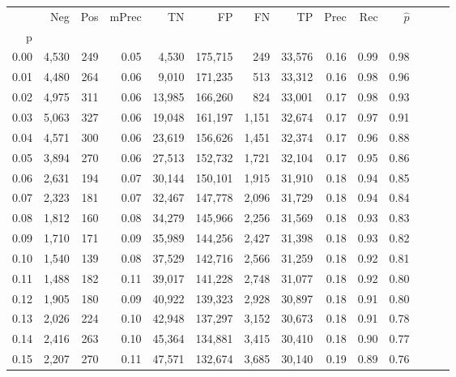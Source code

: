 \begin{tabular}{rrrrrrrrrrrrrr}
\toprule
{} &    Neg &  Pos & mPrec &       TN &       FP &      FN &      TP &  Prec &   Rec & $\hat{p}$ \\
p    &        &      &       &          &          &         &         &       &       &           \\
\midrule
0.00 &  4,530 &  249 &  0.05 &    4,530 &  175,715 &     249 &  33,576 &  0.16 &  0.99 &      0.98 \\
0.01 &  4,480 &  264 &  0.06 &    9,010 &  171,235 &     513 &  33,312 &  0.16 &  0.98 &      0.96 \\
0.02 &  4,975 &  311 &  0.06 &   13,985 &  166,260 &     824 &  33,001 &  0.17 &  0.98 &      0.93 \\
0.03 &  5,063 &  327 &  0.06 &   19,048 &  161,197 &   1,151 &  32,674 &  0.17 &  0.97 &      0.91 \\
0.04 &  4,571 &  300 &  0.06 &   23,619 &  156,626 &   1,451 &  32,374 &  0.17 &  0.96 &      0.88 \\
0.05 &  3,894 &  270 &  0.06 &   27,513 &  152,732 &   1,721 &  32,104 &  0.17 &  0.95 &      0.86 \\
0.06 &  2,631 &  194 &  0.07 &   30,144 &  150,101 &   1,915 &  31,910 &  0.18 &  0.94 &      0.85 \\
0.07 &  2,323 &  181 &  0.07 &   32,467 &  147,778 &   2,096 &  31,729 &  0.18 &  0.94 &      0.84 \\
0.08 &  1,812 &  160 &  0.08 &   34,279 &  145,966 &   2,256 &  31,569 &  0.18 &  0.93 &      0.83 \\
0.09 &  1,710 &  171 &  0.09 &   35,989 &  144,256 &   2,427 &  31,398 &  0.18 &  0.93 &      0.82 \\
0.10 &  1,540 &  139 &  0.08 &   37,529 &  142,716 &   2,566 &  31,259 &  0.18 &  0.92 &      0.81 \\
0.11 &  1,488 &  182 &  0.11 &   39,017 &  141,228 &   2,748 &  31,077 &  0.18 &  0.92 &      0.80 \\
0.12 &  1,905 &  180 &  0.09 &   40,922 &  139,323 &   2,928 &  30,897 &  0.18 &  0.91 &      0.80 \\
0.13 &  2,026 &  224 &  0.10 &   42,948 &  137,297 &   3,152 &  30,673 &  0.18 &  0.91 &      0.78 \\
0.14 &  2,416 &  263 &  0.10 &   45,364 &  134,881 &   3,415 &  30,410 &  0.18 &  0.90 &      0.77 \\
0.15 &  2,207 &  270 &  0.11 &   47,571 &  132,674 &   3,685 &  30,140 &  0.19 &  0.89 &      0.76 \\

\end{tabular}
